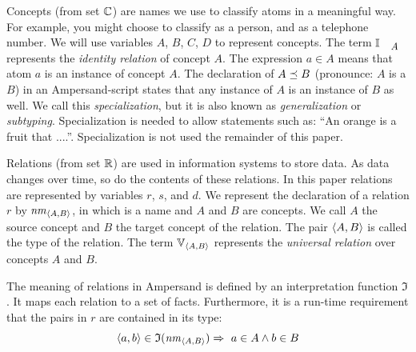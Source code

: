 \documentclass{svproc}
\begin{document}
	Concepts (from set $\mathbb{C}$) are names we use to classify atoms in a meaningful way.
	For example, you might choose to classify  as a person, and  as a telephone number.
        We will use variables $A$, $B$, $C$, $D$ to represent concepts.
	The term $\ident{A}$ represents the \emph{identity relation} of concept $A$.
	The expression $a \in A$ means that atom $a$ is an instance of concept $A$.
	The declaration of $A\preceq B$ (pronounce: $A$ is a $B$)
	in an Ampersand-script states that any instance of $A$ is an instance of $B$ as well.
	We call this {\em specialization}, but it is also known as {\em generalization} or {\em subtyping}.
	Specialization is needed to allow statements such as: ``An orange is a fruit that ....''.
	Specialization is not used the remainder of this paper.

	Relations (from set $\mathbb{R}$) are used in information systems to store data.
	As data changes over time, so do the contents of these relations.
	In this paper relations are represented by variables $r$, $s$, and $d$.
	We represent the declaration of a relation $r$ by $\text{\em nm\/}_{\langle{A},{B}\rangle}$,
	in which  is a name and $A$ and $B$ are concepts.
	We call $A$ the source concept and $B$ the target concept of the relation.
	The pair $\langle{A},{B}\rangle$ is called the type of the relation.
	The term $\fullt{A}{B}$ represents the \emph{universal relation} over concepts $A$ and $B$.

    The meaning of relations in Ampersand is defined by an interpretation function $\mathfrak{I}$.
	It maps each relation to a set of facts.
	Furthermore, it is a run-time requirement that the pairs in $r$ are contained in its type:
\begin{equation}
	\langle{a},{b}\rangle\in\mathfrak{I}(\text{\em nm\/}_{\langle{A},{B}\rangle}) \Rightarrow\ a \in A \wedge b \in B \label{typing of relations}
\end{equation}
\end{document}
